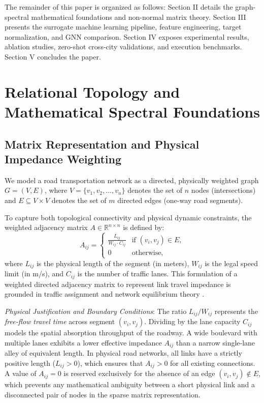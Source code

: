 \documentclass[lettersize,journal]{IEEEtran}
\begin{document}
The remainder of this paper is organized as follows: Section II details the graph-spectral mathematical foundations and non-normal matrix theory. Section III presents the surrogate machine learning pipeline, feature engineering, target normalization, and GNN comparison. Section IV exposes experimental results, ablation studies, zero-shot cross-city validations, and execution benchmarks. Section V concludes the paper.

\section{Relational Topology and Mathematical Spectral Foundations}

\subsection{Matrix Representation and Physical Impedance Weighting}
We model a road transportation network as a directed, physically weighted graph $G = (V, E)$, where $V = \{v_1, v_2, \dots, v_n\}$ denotes the set of $n$ nodes (intersections) and $E \subseteq V \times V$ denotes the set of $m$ directed edges (one-way road segments).

To capture both topological connectivity and physical dynamic constraints, the weighted adjacency matrix $A \in \mathbb{R}^{n \times n}$ is defined by:
\begin{equation}
A_{ij} = \begin{cases} 
\frac{L_{ij}}{W_{ij} \cdot C_{ij}} & \text{if } (v_i, v_j) \in E, \\ 
0 & \text{otherwise,} 
\end{cases}
\label{eq:adjacency}
\end{equation}
where $L_{ij}$ is the physical length of the segment (in meters), $W_{ij}$ is the legal speed limit (in m/s), and $C_{ij}$ is the number of traffic lanes. This formulation of a weighted directed adjacency matrix to represent link travel impedance is grounded in traffic assignment and network equilibrium theory \cite{Sheffi1985, Newman2010}.

\textit{Physical Justification and Boundary Conditions}: The ratio $L_{ij}/W_{ij}$ represents the \emph{free-flow travel time} across segment $(v_i, v_j)$. Dividing by the lane capacity $C_{ij}$ models the spatial absorption throughput of the roadway. A wide boulevard with multiple lanes exhibits a lower effective impedance $A_{ij}$ than a narrow single-lane alley of equivalent length. In physical road networks, all links have a strictly positive length ($L_{ij} > 0$), which ensures that $A_{ij} > 0$ for all existing connections. A value of $A_{ij} = 0$ is reserved exclusively for the absence of an edge $(v_i, v_j) \notin E$, which prevents any mathematical ambiguity between a short physical link and a disconnected pair of nodes in the sparse matrix representation.
\end{document}
